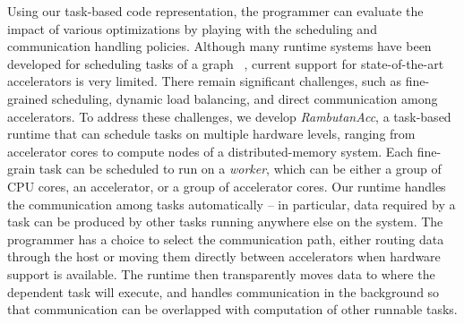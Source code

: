 Using our task-based code representation, the programmer can evaluate the impact of various optimizations by playing with the scheduling and communication handling policies.
Although many runtime systems have been developed for scheduling tasks of a graph ~\cite{legion,physics,mpiacc,mvapich2gpu}, current support for state-of-the-art accelerators is very limited.
There remain significant challenges, such as fine-grained scheduling, dynamic load balancing, and direct communication among accelerators.
To address these challenges, we develop {\em RambutanAcc}, a task-based runtime that can schedule tasks on multiple hardware levels, ranging from accelerator cores to compute nodes of a distributed-memory system.
Each fine-grain task can be scheduled to run on a {\em worker}, which can be either a group of CPU cores, an accelerator, or a group of accelerator cores.
Our runtime handles the communication among tasks automatically -- in particular, data required by a task can be produced by other tasks running anywhere else on the system.
The programmer has a choice to select the communication path, either routing data through the host or moving them directly between accelerators when hardware support is available.
The runtime then transparently moves data to where the dependent task will execute, and handles communication in the background so that communication can be overlapped with computation of other runnable tasks.

